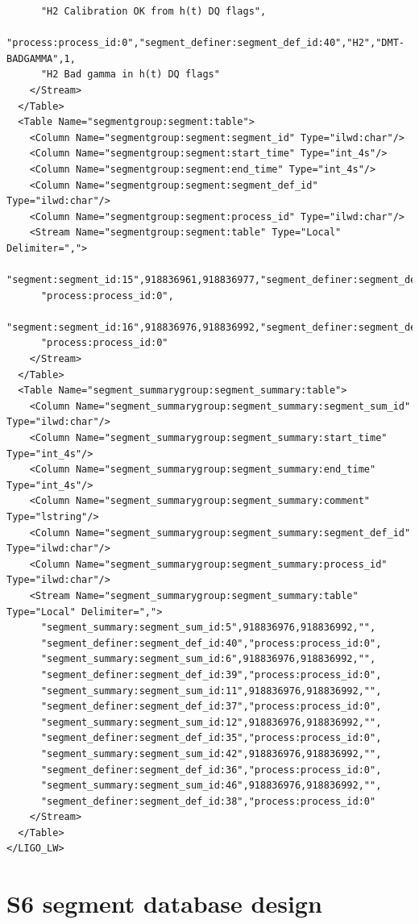 {\begin{verbatim}
      "H2 Calibration OK from h(t) DQ flags",
      "process:process_id:0","segment_definer:segment_def_id:40","H2","DMT-BADGAMMA",1,
      "H2 Bad gamma in h(t) DQ flags"
    </Stream>
  </Table>
  <Table Name="segmentgroup:segment:table">
    <Column Name="segmentgroup:segment:segment_id" Type="ilwd:char"/>
    <Column Name="segmentgroup:segment:start_time" Type="int_4s"/>
    <Column Name="segmentgroup:segment:end_time" Type="int_4s"/>
    <Column Name="segmentgroup:segment:segment_def_id" Type="ilwd:char"/>
    <Column Name="segmentgroup:segment:process_id" Type="ilwd:char"/>
    <Stream Name="segmentgroup:segment:table" Type="Local" Delimiter=",">
      "segment:segment_id:15",918836961,918836977,"segment_definer:segment_def_id:35",
      "process:process_id:0",
      "segment:segment_id:16",918836976,918836992,"segment_definer:segment_def_id:37",
      "process:process_id:0"
    </Stream>
  </Table>
  <Table Name="segment_summarygroup:segment_summary:table">
    <Column Name="segment_summarygroup:segment_summary:segment_sum_id" Type="ilwd:char"/>
    <Column Name="segment_summarygroup:segment_summary:start_time" Type="int_4s"/>
    <Column Name="segment_summarygroup:segment_summary:end_time" Type="int_4s"/>
    <Column Name="segment_summarygroup:segment_summary:comment" Type="lstring"/>
    <Column Name="segment_summarygroup:segment_summary:segment_def_id" Type="ilwd:char"/>
    <Column Name="segment_summarygroup:segment_summary:process_id" Type="ilwd:char"/>
    <Stream Name="segment_summarygroup:segment_summary:table" Type="Local" Delimiter=",">
      "segment_summary:segment_sum_id:5",918836976,918836992,"",
      "segment_definer:segment_def_id:40","process:process_id:0",
      "segment_summary:segment_sum_id:6",918836976,918836992,"",
      "segment_definer:segment_def_id:39","process:process_id:0",
      "segment_summary:segment_sum_id:11",918836976,918836992,"",
      "segment_definer:segment_def_id:37","process:process_id:0",
      "segment_summary:segment_sum_id:12",918836976,918836992,"",
      "segment_definer:segment_def_id:35","process:process_id:0",
      "segment_summary:segment_sum_id:42",918836976,918836992,"",
      "segment_definer:segment_def_id:36","process:process_id:0",
      "segment_summary:segment_sum_id:46",918836976,918836992,"",
      "segment_definer:segment_def_id:38","process:process_id:0"
    </Stream>
  </Table>
</LIGO_LW>
\end{verbatim}
}

\section{S6 segment database design}
\label{sec:segment_database_design}


